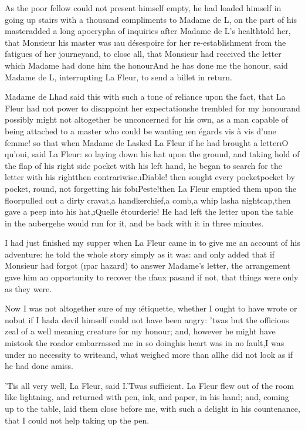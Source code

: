 \documentclass[twoside]{article}
\begin{document}
As the poor fellow could not present himself empty, he had loaded himself
in going up stairs with a thousand compliments to Madame de L\tsk , on the
part of his master\tsk added a long apocrypha of inquiries after Madame de
L\tsk ’s health\tsk told her, that Monsieur his master was \i{au désespoire} for
her re-establishment from the fatigues of her journey\tsk and, to close all,
that Monsieur had received the letter which Madame had done him the
honour\tsk And he has done me the honour, said Madame de L\tsk , interrupting La
Fleur, to send a billet in return.

Madame de L\tsk  had said this with such a tone of reliance upon the fact,
that La Fleur had not power to disappoint her expectations\tsk he trembled
for my honour\tsk and possibly might not altogether be unconcerned for his
own, as a man capable of being attached to a master who could be wanting
\i{en égards vis à vis d’une femme}! so that when Madame de L\tsk  asked La
Fleur if he had brought a letter\tsk \i{O qu’oui}, said La Fleur: so laying
down his hat upon the ground, and taking hold of the flap of his right
side pocket with his left hand, he began to search for the letter with
his right\tsk then contrariwise.\tsk \i{Diable}! then sought every pocket\tsk pocket
by pocket, round, not forgetting his fob\tsk \i{Peste}!\tsk then La Fleur emptied
them upon the floor\tsk pulled out a dirty cravat,\tsk a handkerchief,\tsk a comb,\tsk a
whip lash\tsk a nightcap,\tsk then gave a peep into his hat,\tsk \i{Quelle
étourderie}!  He had left the letter upon the table in the auberge\tsk he
would run for it, and be back with it in three minutes.

I had just finished my supper when La Fleur came in to give me an account
of his adventure: he told the whole story simply as it was: and only
added that if Monsieur had forgot (\i{par hazard}) to answer Madame’s
letter, the arrangement gave him an opportunity to recover the \i{faux
pas}\tsk and if not, that things were only as they were.

Now I was not altogether sure of my \i{étiquette}, whether I ought to have
wrote or no\tsk but if I had\tsk a devil himself could not have been angry:
’twas but the officious zeal of a well meaning creature for my honour;
and, however he might have mistook the road\tsk or embarrassed me in so
doing\tsk his heart was in no fault,\tsk I was under no necessity to write\tsk and,
what weighed more than all\tsk he did not look as if he had done amiss.

\tsk ’Tis all very well, La Fleur, said I.\tsk ’Twas sufficient.  La Fleur flew
out of the room like lightning, and returned with pen, ink, and paper, in
his hand; and, coming up to the table, laid them close before me, with
such a delight in his countenance, that I could not help taking up the
pen.
\end{document}
